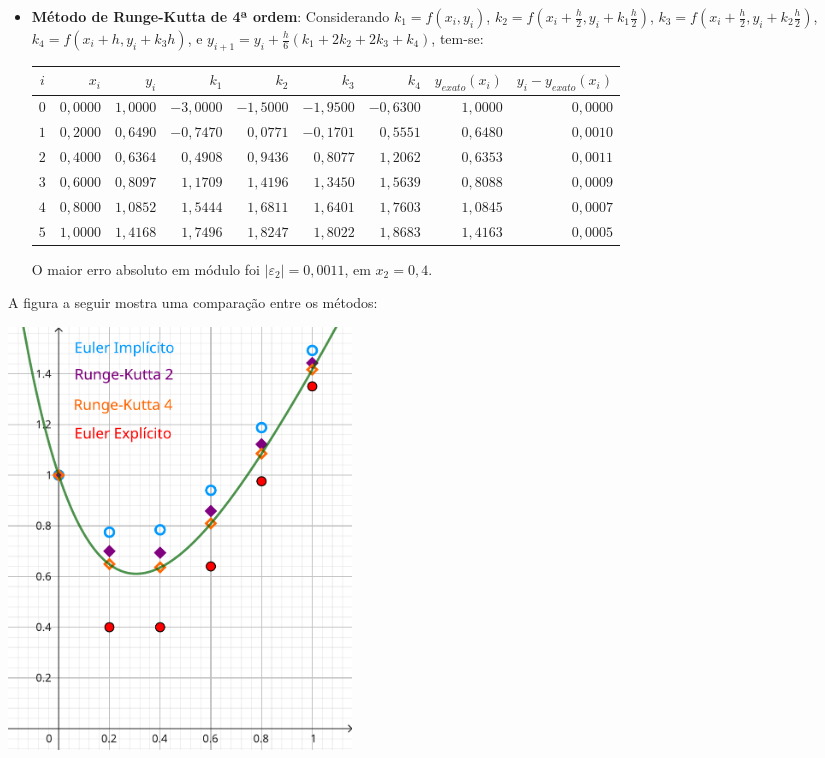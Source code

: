 \documentclass[12pt,a4paper]{article}
\begin{document}
\begin{enumerate}
\begin{itemize}
\item \textbf{Método de Runge-Kutta de 4ª ordem}: Considerando
$k_1 = f(x_i, y_i)$,
$k_2 = f(x_i + \frac{h}{2}, y_i + k_1 \frac{h}{2})$,
$k_3 = f(x_i + \frac{h}{2}, y_i + k_2 \frac{h}{2})$,
$k_4 = f(x_i +       h    , y_i + k_3 h)$, e
$y_{i+1} = y_i + \frac{h}{6} (k_1 + 2k_2 + 2k_3 + k_4)$, tem-se:
\begin{center}
   \begin{footnotesize}
      \begin{tabular}{crrrrrrrr}
      \hline
        $i$ & $x_i$  & $y_i$ & $k_1$ & $k_2$ & $k_3$ & $k_4$ & $y_{exato}(x_i)$
        & $y_i-y_{exato}(x_i)$ \\ \hline
      $0$ & $0,0000$ & $1,0000$ & $-3,0000$ & $-1,5000$ & $-1,9500$ & $-0,6300$ & $1,0000$ & $0,0000$ \\
      $1$ & $0,2000$ & $0,6490$ & $-0,7470$ & $ 0,0771$ & $-0,1701$ & $ 0,5551$ & $0,6480$ & $0,0010$ \\
      $2$ & $0,4000$ & $0,6364$ & $ 0,4908$ & $ 0,9436$ & $ 0,8077$ & $ 1,2062$ & $0,6353$ & $0,0011$ \\
      $3$ & $0,6000$ & $0,8097$ & $ 1,1709$ & $ 1,4196$ & $ 1,3450$ & $ 1,5639$ & $0,8088$ & $0,0009$ \\
      $4$ & $0,8000$ & $1,0852$ & $ 1,5444$ & $ 1,6811$ & $ 1,6401$ & $ 1,7603$ & $1,0845$ & $0,0007$ \\
      $5$ & $1,0000$ & $1,4168$ & $ 1,7496$ & $ 1,8247$ & $ 1,8022$ & $ 1,8683$ & $1,4163$ & $0,0005$ \\
      \hline
      \end{tabular}
   \end{footnotesize}
\end{center}
O maior erro absoluto em módulo foi $|\varepsilon_2| = 0,0011$, em $x_2 = 0,4$.
\end{itemize}

A figura a seguir mostra uma comparação entre os métodos:
\begin{center}
   \includegraphics[width=0.4\textwidth]{img/22-equações-diferenciais-comparação.pdf}
\end{center}
\end{enumerate}
\end{document}
